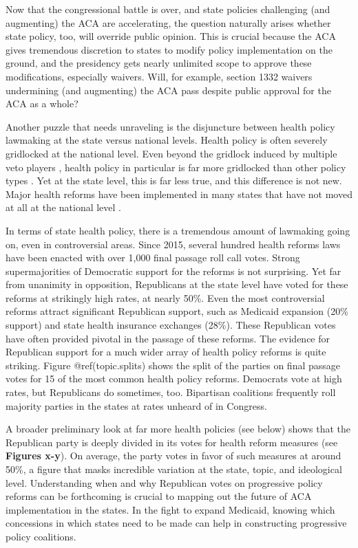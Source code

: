 \documentclass[
  oneside]{book}
\begin{document}
Now that the congressional battle is over, and state policies challenging (and augmenting) the ACA are accelerating, the question naturally arises whether state policy, too, will override public opinion. This is crucial because the ACA gives tremendous discretion to states to modify policy implementation on the ground, and the presidency gets nearly unlimited scope to approve these modifications, especially waivers. Will, for example, section 1332 waivers undermining (and augmenting) the ACA pass despite public approval for the ACA as a whole?

Another puzzle that needs unraveling is the disjuncture between health policy lawmaking at the state versus national levels. Health policy is often severely gridlocked at the national level. Even beyond the gridlock induced by multiple veto players \citep{Krehbiel:1998}, health policy in particular is far more gridlocked than other policy types \citep{Volden:2011}. Yet at the state level, this is far less true, and this difference is not new. Major health reforms have been implemented in many states that have not moved at all at the national level \citep{Gray:2013}.

In terms of state health policy, there is a tremendous amount of lawmaking going on, even in controversial areas. Since 2015, several hundred health reforms laws have been enacted with over 1,000 final passage roll call votes. Strong supermajorities of Democratic support for the reforms is not surprising. Yet far from unanimity in opposition, Republicans at the state level have voted for these reforms at strikingly high rates, at nearly 50\%. Even the most controversial reforms attract significant Republican support, such as Medicaid expansion (20\% support) and state health insurance exchanges (28\%). These Republican votes have often provided pivotal in the passage of these reforms. The evidence for Republican support for a much wider array of health policy reforms is quite striking. Figure @ref(topic.splits) shows the split of the parties on final passage votes for 15 of the most common health policy reforms. Democrats vote at high rates, but Republicans do sometimes, too. Bipartisan coalitions frequently roll majority parties in the states at rates unheard of in Congress.

A broader preliminary look at far more health policies (see below) shows that the Republican party is deeply divided in its votes for health reform measures (see \textbf{Figures x-y}). On average, the party votes in favor of such measures at around 50\%, a figure that masks incredible variation at the state, topic, and ideological level. Understanding when and why Republican votes on progressive policy reforms can be forthcoming is crucial to mapping out the future of ACA implementation in the states. In the fight to expand Medicaid, knowing which concessions in which states need to be made can help in constructing progressive policy coalitions.
\end{document}
